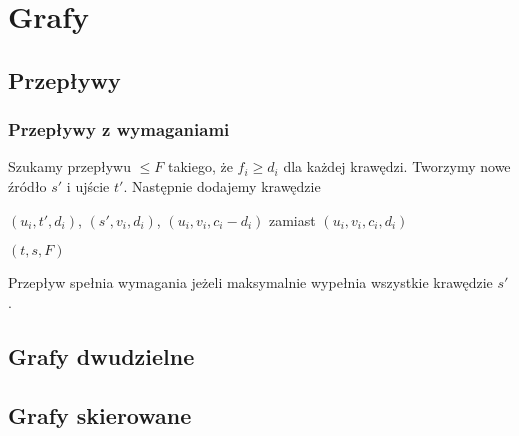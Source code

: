 \section{Grafy}

\subsection{Przepływy}

\subsubsection{Przepływy z wymaganiami}
Szukamy przepływu $\leq F$ takiego, że $f_i \geq d_i$ dla każdej krawędzi.
Tworzymy nowe źródło $s'$ i ujście $t'$.
Następnie dodajemy krawędzie
\begin{compactitem}
  \item $(u_i, t', d_i)$, $(s', v_i, d_i)$, $(u_i, v_i, c_i - d_i)$ zamiast $(u_i, v_i, c_i, d_i)$ 
  \item $(t, s, F)$
\end{compactitem}
Przepływ spełnia wymagania jeżeli maksymalnie wypełnia wszystkie krawędzie $s'$.

\subsection{Grafy dwudzielne}

\subsection{Grafy skierowane}
